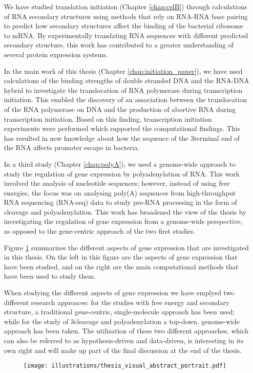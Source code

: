We have studied translation initiation (Chapter \ref{chap:celB}) through
calculations of RNA secondary structures using methods that rely on RNA-RNA
base pairing to predict how secondary structures affect the binding of the
bacterial ribosome to mRNA. By experimentally translating RNA sequences with
different predicted secondary structure, this work has contributed to a greater
understanding of several protein expression systems.

In the main work of this thesis (Chapter \ref{chap:initiation_paper}), we have
used calculations of the binding strengths of double stranded DNA and the
RNA-DNA hybrid to investigate the translocation of RNA polymerase during
transcription initiation. This enabled the discovery of an association between
the translocation of the RNA polymerase on DNA and the production of abortive
RNA during transcription initiation. Based on this finding, transcription
initiation experiments were performed which supported the computational
findings. This has resulted in new knowledge about how the sequence of the
3\ppp terminal end of the RNA affects promoter escape in bacteria.

In a third study (Chapter \ref{chap:polyA}), we used a genome-wide approach to
study the regulation of gene expression by polyadenylation of RNA. This work
involved the analysis of nucleotide sequences; however, instead of using free
energies, the focus was on analysing poly(A) sequences from high-throughput RNA
sequencing (RNA-seq) data to study pre-RNA processing in the form of cleavage
and polyadenylation. This work has broadened the view of the thesis by
investigating the regulation of gene expression from a genome-wide perspective,
as opposed to the gene-centric approach of the two first studies.

Figure \ref{fig:thesis_visual} summarizes the different aspects of gene
expression that are investigated in this thesis. On the left in this figure are
the aspects of gene expression that have been studied, and on the right are the
main computational methods that have been used to study them.

When studying the different aspects of gene expression we have emplyed two
different research approaces: for the studies with free energy and secondary
structure, a traditional gene-centric, single-molecule approach has been used;
while for the study of 3\ppp cleavage and polyadenylation a top-down,
genome-wide approach has been taken. The utilization of these two different
approaches, which can also be referred to as hypothesis-driven and data-driven,
is interesting in its own right and will make up part of the final discussion
at the end of the thesis.

\begin{figure}[htb]
	\begin{center}
		\texttt{[image: illustrations/thesis\_visual\_abstract\_portrait.pdf]}
	\end{center}
	\caption{}
	\label{fig:thesis_visual}
\end{figure}
